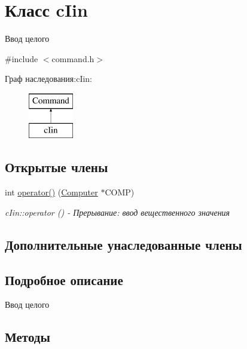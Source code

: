 \hypertarget{classc_iin}{}\section{Класс c\+Iin}
\label{classc_iin}


Ввод целого  




{\ttfamily \#include $<$command.\+h$>$}

Граф наследования\+:c\+Iin\+:\begin{figure}[H]
\begin{center}
\leavevmode
\includegraphics[height=2.000000cm]{classc_iin}
\end{center}
\end{figure}
\subsection*{Открытые члены}
\begin{DoxyCompactItemize}
\item 
int \hyperlink{classc_iin_a80d23ca91e78c52713f1d645df0d1d7d}{operator()} (\hyperlink{class_computer}{Computer} $\ast$C\+O\+MP)
\begin{DoxyCompactList}\small\item\em c\+Iin\+::operator () -\/ Прерывание\+: ввод вещественного значения \end{DoxyCompactList}\end{DoxyCompactItemize}
\subsection*{Дополнительные унаследованные члены}


\subsection{Подробное описание}
Ввод целого 

\subsection{Методы}
\hypertarget{classc_iin_a80d23ca91e78c52713f1d645df0d1d7d}{}\label{classc_iin_a80d23ca91e78c52713f1d645df0d1d7d} 

